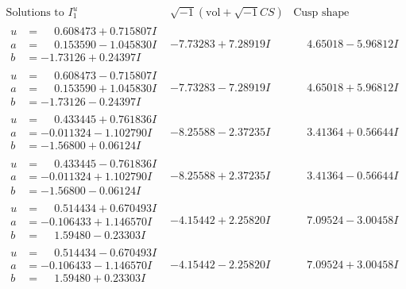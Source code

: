 \documentclass[1p]{elsarticle_modified}
\theoremstyle{definition}
\newcommand{\I}{\sqrt{-1}}
\begin{document}
$$\begin{array}{c|c|c}  
\text{Solutions to }I^u_{1}& \I (\text{vol} + \sqrt{-1}CS) & \text{Cusp shape}\\
 \hline 
\begin{aligned}
u &= \phantom{-}0.608473 + 0.715807 I \\
a &= \phantom{-}0.153590 - 1.045830 I \\
b &= -1.73126 + 0.24397 I\end{aligned}
 & -7.73283 + 7.28919 I & \phantom{-}4.65018 - 5.96812 I \\ \hline\begin{aligned}
u &= \phantom{-}0.608473 - 0.715807 I \\
a &= \phantom{-}0.153590 + 1.045830 I \\
b &= -1.73126 - 0.24397 I\end{aligned}
 & -7.73283 - 7.28919 I & \phantom{-}4.65018 + 5.96812 I \\ \hline\begin{aligned}
u &= \phantom{-}0.433445 + 0.761836 I \\
a &= -0.011324 - 1.102790 I \\
b &= -1.56800 + 0.06124 I\end{aligned}
 & -8.25588 - 2.37235 I & \phantom{-}3.41364 + 0.56644 I \\ \hline\begin{aligned}
u &= \phantom{-}0.433445 - 0.761836 I \\
a &= -0.011324 + 1.102790 I \\
b &= -1.56800 - 0.06124 I\end{aligned}
 & -8.25588 + 2.37235 I & \phantom{-}3.41364 - 0.56644 I \\ \hline\begin{aligned}
u &= \phantom{-}0.514434 + 0.670493 I \\
a &= -0.106433 + 1.146570 I \\
b &= \phantom{-}1.59480 - 0.23303 I\end{aligned}
 & -4.15442 + 2.25820 I & \phantom{-}7.09524 - 3.00458 I \\ \hline\begin{aligned}
u &= \phantom{-}0.514434 - 0.670493 I \\
a &= -0.106433 - 1.146570 I \\
b &= \phantom{-}1.59480 + 0.23303 I\end{aligned}
 & -4.15442 - 2.25820 I & \phantom{-}7.09524 + 3.00458 I \\ \hline\begin{aligned}

\end{aligned}
\end{array}$$
\end{document}
